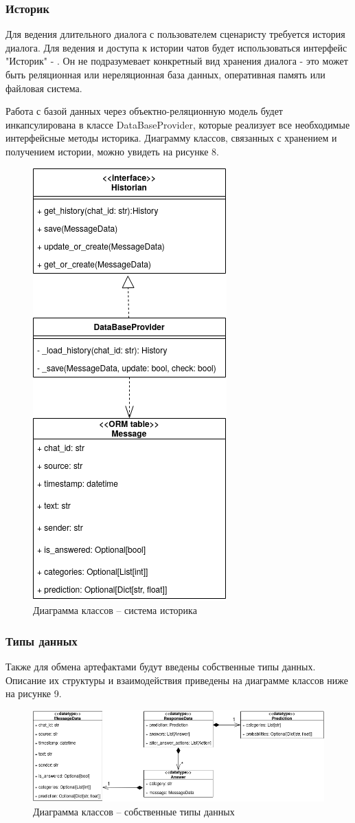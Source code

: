     \newpage
    \subsubsection{Историк}
    Для ведения длительного диалога с пользователем сценаристу требуется история
    диалога. Для ведения и доступа к истории чатов будет использоваться интерфейс
    "Историк" - . Он не подразумевает конкретный вид хранения
    диалога - это может быть реляционная или нереляционная база данных,
    оперативная память или файловая система.
    
    Работа с базой данных через объектно-реляционную модель будет инкапсулирована
    в классе DataBaseProvider, которые реализует все необходимые интерфейсные
    методы историка. Диаграмму классов, связанных с хранением и получением
    истории, можно увидеть на рисунке 8.
    \begin{figure}[H]
        \centering

        \includegraphics[width=0.3\linewidth]{static/ClassDiagram_dbprovider.png}
        \caption{Диаграмма классов -- система историка}
        \label{fig:class-diagram-dbprovider}
    \end{figure}

    \newpage
    \subsubsection{Типы данных}
    Также для обмена артефактами будут введены собственные типы данных.
    Описание их структуры и взаимодействия приведены на диаграмме классов ниже
    на рисунке 9.
    \begin{figure}[H]
        \centering
        \includegraphics[width=\linewidth]{static/ClassDiagram_datatypes.png}
        \caption{Диаграмма классов -- собственные типы данных}
        \label{fig:class-diagram-datatypes}
    \end{figure}

